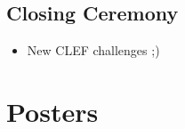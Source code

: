 \documentclass[a4paper]{article}
\begin{document}
\subsection{Closing Ceremony}
\begin{itemize}
    \item New CLEF challenges ;)
\end{itemize}

\section{Posters}
 
\end{document}
